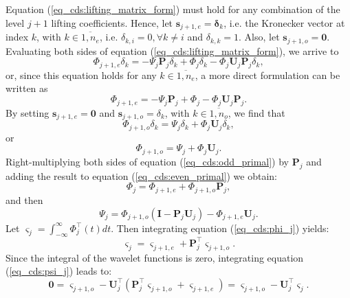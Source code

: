 \documentclass[graybox]{svmult}
\begin{document}
	Equation (\ref{eq_cds:lifting_matrix_form}) must hold for any combination of the level $j+1$ lifting coefficients. Hence, let $\mathbf{s}_{j+1,e} = \mathbf{\delta}_k$, i.e. the Kronecker vector at index $k$, with $k \in \overline{1,n_e}$, i.e. $\delta_{k,i} = 0, \forall k \neq i$ and $\delta_{k,k} = 1$. Also, let $\mathbf{s}_{j+1,o} = \mathbf{0}$. Evaluating both sides of equation (\ref{eq_cds:lifting_matrix_form}), we arrive to
	\begin{equation}
	\Phi_{j+1,e}\delta_k = -\Psi_j\mathbf{P}_j\delta_k + \Phi_j \delta_k - \Phi_j \mathbf{U}_j\mathbf{P}_j \delta_k,
	\end{equation}
	or, since this equation holds for any $k \in \overline{1, n_e}$, a more direct formulation can be written as
	\begin{equation}
	\Phi_{j+1,e}= -\Psi_j\mathbf{P}_j + \Phi_j  - \Phi_j \mathbf{U}_j\mathbf{P}_j.
	\label{eq_cds:even_primal}
	\end{equation}
	By setting $\mathbf{s}_{j+1,e} = \mathbf{0}$ and $\mathbf{s}_{j+1,o} = \delta_k$, with $k \in \overline{1, n_o}$, we find that
	\begin{equation}
	\Phi_{j+1,o}\delta_k  = \Psi_j \delta_k + \Phi_j \mathbf{U}_j \delta_k,
	\end{equation}
	or
	\begin{equation}
	\Phi_{j+1,o} = \Psi_j + \Phi_j \mathbf{U}_j.
	\label{eq_cds:odd_primal}
	\end{equation}
	Right-multiplying both sides of equation (\ref{eq_cds:odd_primal}) by $\mathbf{P}_j$ and adding the result to equation (\ref{eq_cds:even_primal}) we obtain:
	\begin{equation}
	\Phi_j = \Phi_{j+1,e} + \Phi_{j+1,o} \mathbf{P}_j,
	\label{eq_cds:phi_j}
	\end{equation}
	and then
	\begin{equation}
	\Psi_j = \Phi_{j+1,o}(\mathbf{I} - \mathbf{P}_j\mathbf{U}_j) - \Phi_{j+1,e}\mathbf{U}_j.
	\label{eq_cds:psi_j}
	\end{equation}
	Let $\varsigma_j = \int_{-\infty}^{\infty}{\Phi_j^\intercal(t) dt}$. Then integrating equation (\ref{eq_cds:phi_j}) yields:
	\begin{equation}
	\varsigma_j = \varsigma_{j+1,e} + \mathbf{P}_j^\intercal \varsigma_{j+1,o}.
	\label{eq_cds:int_scaling}
	\end{equation}
	Since the integral of the wavelet functions is zero, integrating equation (\ref{eq_cds:psi_j})  leads to:
	\begin{equation}
	\mathbf{0} = \varsigma_{j+1,o} - \mathbf{U}_j^\intercal \left(\mathbf{P}_j^\intercal \varsigma_{j+1,o} + \varsigma_{j+1,e} \right) = \varsigma_{j+1,o} - \mathbf{U}_j^\intercal \varsigma_j.
	\label{eq_cds:int_wavelet}
	\end{equation}
\end{document}
